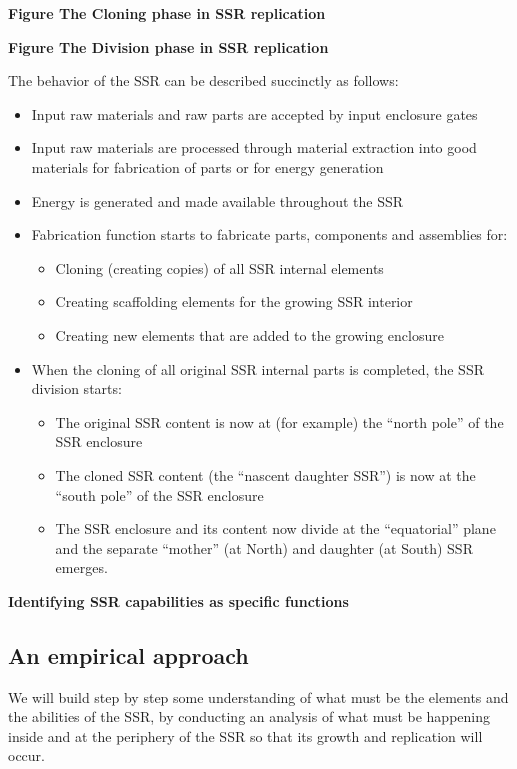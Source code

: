 \documentclass[letterpaper]{article}
\begin{document}
\bigskip

{\bfseries
\label{bkm:Ref329890094}Figure  The Cloning phase in SSR replication}


\bigskip


\bigskip

{\bfseries
\label{bkm:Ref329890734}Figure  The Division phase in SSR replication}


\bigskip

The behavior of the SSR can be described succinctly as follows:

\begin{itemize}
\item Input raw materials and raw parts are accepted by input enclosure
gates
\item Input raw materials are processed through material extraction into
good materials for fabrication of parts or for energy generation
\item Energy is generated and made available throughout the SSR
\item Fabrication function starts to fabricate parts, components and
assemblies for: 

\begin{itemize}
\item Cloning (creating copies) of all SSR internal elements
\item Creating scaffolding elements for the growing SSR interior
\item Creating new elements that are added to the growing enclosure
\end{itemize}
\item When the cloning of all original SSR internal parts is completed,
the SSR division starts:

\begin{itemize}
\item The original SSR content is now at (for example) the “north pole”
of the SSR enclosure
\item The cloned SSR content (the “nascent daughter SSR”) is now at the
“south pole” of the SSR enclosure
\item The SSR enclosure and its content now divide at the “equatorial”
plane and the separate “mother” (at North) and daughter (at South) SSR
emerges.
\end{itemize}
\end{itemize}
{\bfseries
\hypertarget{RefHeading3046306210128}{}Identifying SSR capabilities as
specific functions}

\subsection[An empirical approach]{An empirical approach}
\hypertarget{RefHeading3048306210128}{}We will build step by step some
understanding of what must be the elements and the abilities of the
SSR, by conducting an analysis of what must be happening inside and at
the periphery of the SSR so that its growth and replication will occur.
\end{document}
